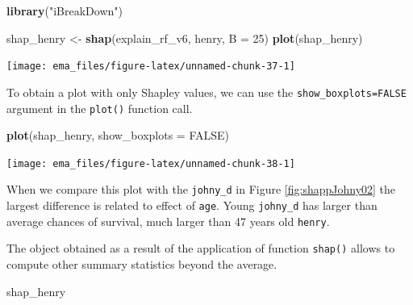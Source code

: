 \documentclass[12pt,]{krantz}
\newenvironment{Shaded}{\begin{snugshade}}{\end{snugshade}}
\newcommand{\DataTypeTok}[1]{\textcolor[rgb]{0.13,0.29,0.53}{#1}}
\newcommand{\DecValTok}[1]{\textcolor[rgb]{0.00,0.00,0.81}{#1}}
\newcommand{\KeywordTok}[1]{\textcolor[rgb]{0.13,0.29,0.53}{\textbf{#1}}}
\newcommand{\NormalTok}[1]{#1}
\newcommand{\OtherTok}[1]{\textcolor[rgb]{0.56,0.35,0.01}{#1}}
\newcommand{\StringTok}[1]{\textcolor[rgb]{0.31,0.60,0.02}{#1}}
\begin{document}
\begin{Shaded}
\begin{Highlighting}[]
\KeywordTok{library}\NormalTok{(}\StringTok{"iBreakDown"}\NormalTok{)}

\NormalTok{shap_henry <-}\StringTok{ }\KeywordTok{shap}\NormalTok{(explain_rf_v6, henry, }\DataTypeTok{B =} \DecValTok{25}\NormalTok{)}
\KeywordTok{plot}\NormalTok{(shap_henry) }
\end{Highlighting}
\end{Shaded}

\begin{center}\texttt{[image: ema\_files/figure-latex/unnamed-chunk-37-1]} \end{center}

To obtain a plot with only Shapley values, we can use the \texttt{show\_boxplots=FALSE} argument in the \texttt{plot()} function call.

\begin{Shaded}
\begin{Highlighting}[]
\KeywordTok{plot}\NormalTok{(shap_henry, }\DataTypeTok{show_boxplots =} \OtherTok{FALSE}\NormalTok{) }
\end{Highlighting}
\end{Shaded}

\begin{center}\texttt{[image: ema\_files/figure-latex/unnamed-chunk-38-1]} \end{center}

When we compare this plot with the \texttt{johny\_d} in Figure \ref{fig:shappJohny02} the largest difference is related to effect of \texttt{age}. Young \texttt{johny\_d} has larger than average chances of survival, much larger than 47 years old \texttt{henry}.

The object obtained as a result of the application of function \texttt{shap()} allows to compute other summary statistics beyond the average.

\begin{Shaded}
\begin{Highlighting}[]
\NormalTok{shap_henry}
\end{Highlighting}
\end{Shaded}
\end{document}

